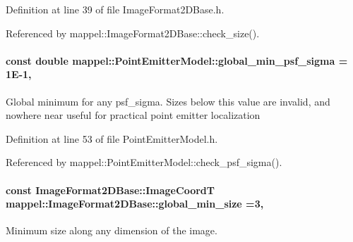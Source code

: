Definition at line 39 of file Image\+Format2\+D\+Base.\+h.



Referenced by mappel\+::\+Image\+Format2\+D\+Base\+::check\+\_\+size().

\paragraph[{\texorpdfstring{global\+\_\+min\+\_\+psf\+\_\+sigma}{global_min_psf_sigma}}]{\setlength{\rightskip}{0pt plus 5cm}const double mappel\+::\+Point\+Emitter\+Model\+::global\+\_\+min\+\_\+psf\+\_\+sigma = 1\+E-\/1\hspace{0.3cm}{\ttfamily [static]}, {\ttfamily [inherited]}}\hypertarget{classmappel_1_1PointEmitterModel_a77d0ca98d77cb8b94117ece2a5b182a4}{}\label{classmappel_1_1PointEmitterModel_a77d0ca98d77cb8b94117ece2a5b182a4}
Global minimum for any psf\+\_\+sigma. Sizes below this value are invalid, and nowhere near useful for practical point emitter localization 

Definition at line 53 of file Point\+Emitter\+Model.\+h.



Referenced by mappel\+::\+Point\+Emitter\+Model\+::check\+\_\+psf\+\_\+sigma().

\paragraph[{\texorpdfstring{global\+\_\+min\+\_\+size}{global_min_size}}]{\setlength{\rightskip}{0pt plus 5cm}const {\bf Image\+Format2\+D\+Base\+::\+Image\+CoordT} mappel\+::\+Image\+Format2\+D\+Base\+::global\+\_\+min\+\_\+size =3\hspace{0.3cm}{\ttfamily [static]}, {\ttfamily [inherited]}}\hypertarget{classmappel_1_1ImageFormat2DBase_a1149e8545d3cfaa40c2f3bc02e3223b2}{}\label{classmappel_1_1ImageFormat2DBase_a1149e8545d3cfaa40c2f3bc02e3223b2}
Minimum size along any dimension of the image. 

